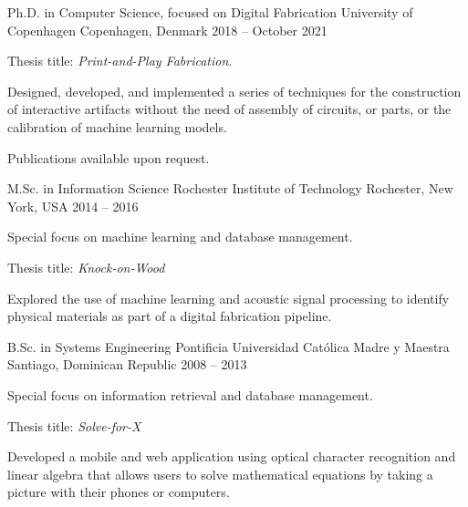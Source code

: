 
\begin{cventries}

  \cventry
    {Ph.D. in Computer Science, focused on Digital Fabrication}
    {University of Copenhagen}
    {Copenhagen, Denmark}
    {2018 -- October 2021}
    {
      \begin{cvitems}
        \item Thesis title: \emph{Print-and-Play Fabrication}. 
        \item Designed, developed, and implemented a series of techniques for the construction of interactive artifacts without the need of assembly of circuits, or parts, or the calibration of machine learning models.
        \item Publications available upon request.
      \end{cvitems}
      \vspace{1em}
    }
    
  \cventry
    {M.Sc. in Information Science}
    {Rochester Institute of Technology}
    {Rochester, New York, USA}
    {2014 -- 2016}
    {
      \begin{cvitems}
        \item Special focus on machine learning and database management.
        \item Thesis title: \emph{Knock-on-Wood}
        \item \hspace{1em} Explored the use of machine learning and acoustic
          signal processing to identify physical materials as part of a digital
          fabrication pipeline.
      \end{cvitems}
      \vspace{1em}
    }

  \cventry
    {B.Sc. in Systems Engineering}
    {Pontificia Universidad Cat\'olica Madre y Maestra}
    {Santiago, Dominican Republic}
    {2008 -- 2013}
    {
      \begin{cvitems}
        \item Special focus on information retrieval and database management.
        \item Thesis title: \emph{Solve-for-X}
        \item \hspace{1em} Developed a mobile and web application using
          optical character recognition and linear algebra that allows users to solve
          mathematical equations by taking a picture with their phones or
          computers.
      \end{cvitems}
    }

\end{cventries}
